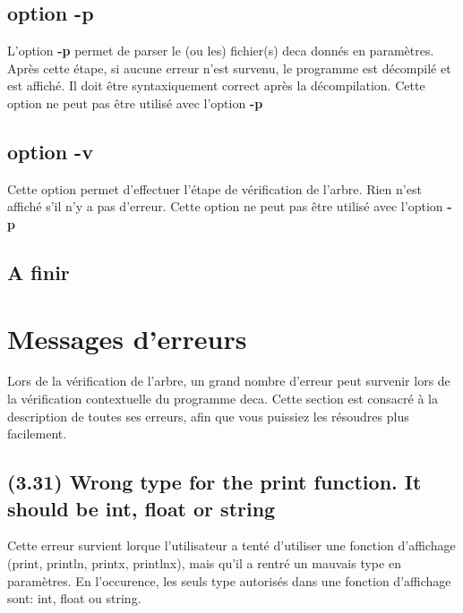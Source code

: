 \documentclass[12pt, a4paper, one side]{article}
\begin{document}
\subsection{option -p}

L'option \textbf{-p} permet de parser le (ou les) fichier(s) deca donnés en paramètres.
Après cette étape, si aucune erreur n'est survenu, le programme est décompilé et est
affiché. Il doit être syntaxiquement correct après la décompilation. Cette option ne peut
pas être utilisé avec l'option \textbf{-p}

\subsection{option -v}

Cette option permet d'effectuer l'étape de vérification de l'arbre. Rien n'est affiché s'il
n'y a pas d'erreur. Cette option ne peut pas être utilisé avec l'option \textbf{-p}

\subsection{A finir }

\section{Messages d'erreurs}

Lors de la vérification de l'arbre, un grand nombre d'erreur peut survenir lors de la vérification
contextuelle du programme deca. Cette section est consacré à la description de toutes ses erreurs,
afin que vous puissiez les résoudres plus facilement.

\subsection{(3.31) Wrong type for the print function. It should be int, float or string}

Cette erreur survient lorque l'utilisateur a tenté d'utiliser une fonction d'affichage (print, println, printx, printlnx),
mais qu'il a rentré un mauvais type en paramètres. En l'occurence, les seuls type autorisés dans une
fonction d'affichage sont: int, float ou string.
\end{document}
